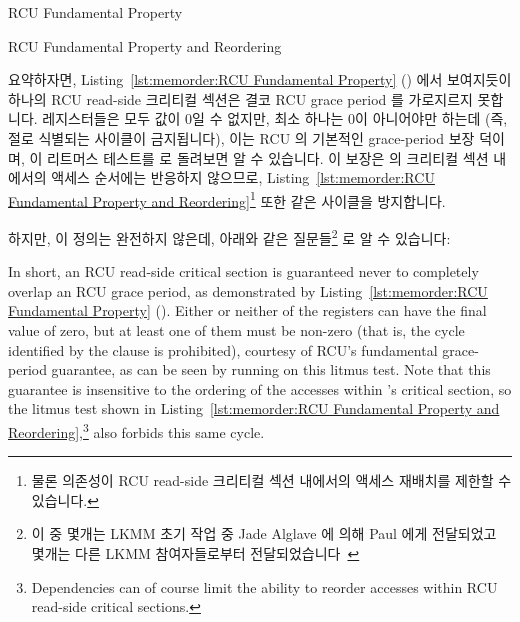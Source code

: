 \begin{listing}[tb]

\caption{RCU Fundamental Property}
\label{lst:memorder:RCU Fundamental Property}
\end{listing}

\begin{listing}[tb]

\caption{RCU Fundamental Property and Reordering}
\label{lst:memorder:RCU Fundamental Property and Reordering}
\end{listing}

요약하자면,
Listing~\ref{lst:memorder:RCU Fundamental Property}
() 에서 보여지듯이 하나의 RCU
read-side 크리티컬 섹션은 결코 RCU grace period 를 가로지르지 못합니다.
 레지스터들은 모두 값이 0일 수 없지만, 최소 하나는 0이 아니어야만 하는데
(즉,  절로 식별되는 사이클이 금지됩니다), 이는 RCU 의 기본적인
grace-period 보장 덕이며, 이 리트머스 테스트를  로 돌려보면 알 수
있습니다.
이 보장은  의 크리티컬 섹션 내에서의 액세스 순서에는 반응하지
않으므로,
Listing~\ref{lst:memorder:RCU Fundamental Property and Reordering}\footnote{
	물론 의존성이 RCU read-side 크리티컬 섹션 내에서의 액세스 재배치를
	제한할 수 있습니다.}
또한 같은 사이클을 방지합니다.

하지만, 이 정의는 완전하지 않은데, 아래와 같은 질문들\footnote{
	이 중 몇개는 LKMM 초기 작업 중 Jade Alglave 에 의해 Paul 에게
	전달되었고 몇개는 다른 LKMM 참여자들로부터
	전달되었습니다~\cite{Alglave:2018:FSC:3173162.3177156}}
로 알 수 있습니다:
\iffalse

In short, an RCU read-side critical section is guaranteed never to
completely overlap an RCU grace period, as demonstrated by
Listing~\ref{lst:memorder:RCU Fundamental Property}
().
Either or neither of the  registers can have the final value of zero,
but at least one of them must be non-zero (that is, the cycle identified
by the  clause is prohibited), courtesy of RCU's fundamental
grace-period guarantee, as can be seen by running  on this litmus test.
Note that this guarantee is insensitive to the ordering of the accesses
within 's critical section, so the litmus test shown in
Listing~\ref{lst:memorder:RCU Fundamental Property and Reordering},\footnote{
	Dependencies can of course limit the ability to reorder accesses
	within RCU read-side critical sections.}
also forbids this same cycle.

